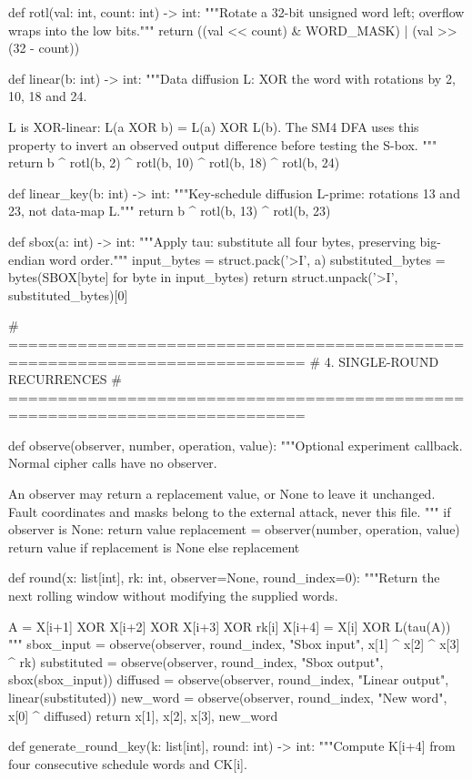 \begin{lightcode}[numbers=left,firstnumber=1]
def rotl(val: int, count: int) -> int:
    """Rotate a 32-bit unsigned word left; overflow wraps into the low bits."""
    return ((val << count) & WORD_MASK) | (val >> (32 - count))


def linear(b: int) -> int:
    """Data diffusion L: XOR the word with rotations by 2, 10, 18 and 24.

    L is XOR-linear: L(a XOR b) = L(a) XOR L(b). The SM4 DFA uses this
    property to invert an observed output difference before testing the S-box.
    """
    return b ^ rotl(b, 2) ^ rotl(b, 10) ^ rotl(b, 18) ^ rotl(b, 24)


def linear_key(b: int) -> int:
    """Key-schedule diffusion L-prime: rotations 13 and 23, not data-map L."""
    return b ^ rotl(b, 13) ^ rotl(b, 23)


def sbox(a: int) -> int:
    """Apply tau: substitute all four bytes, preserving big-endian word order."""
    input_bytes = struct.pack('>I', a)
    substituted_bytes = bytes(SBOX[byte] for byte in input_bytes)
    return struct.unpack('>I', substituted_bytes)[0]


# ============================================================================
# 4. SINGLE-ROUND RECURRENCES
# ============================================================================


def observe(observer, number, operation, value):
    """Optional experiment callback. Normal cipher calls have no observer.

    An observer may return a replacement value, or None to leave it unchanged.
    Fault coordinates and masks belong to the external attack, never this file.
    """
    if observer is None:
        return value
    replacement = observer(number, operation, value)
    return value if replacement is None else replacement


def round(x: list[int], rk: int, observer=None, round_index=0):
    """Return the next rolling window without modifying the supplied words.

    A = X[i+1] XOR X[i+2] XOR X[i+3] XOR rk[i]
    X[i+4] = X[i] XOR L(tau(A))
    """
    sbox_input = observe(observer, round_index, "Sbox input", x[1] ^ x[2] ^ x[3] ^ rk)
    substituted = observe(observer, round_index, "Sbox output", sbox(sbox_input))
    diffused = observe(observer, round_index, "Linear output", linear(substituted))
    new_word = observe(observer, round_index, "New word", x[0] ^ diffused)
    return x[1], x[2], x[3], new_word


def generate_round_key(k: list[int], round: int) -> int:
    """Compute K[i+4] from four consecutive schedule words and CK[i].


\end{lightcode}
